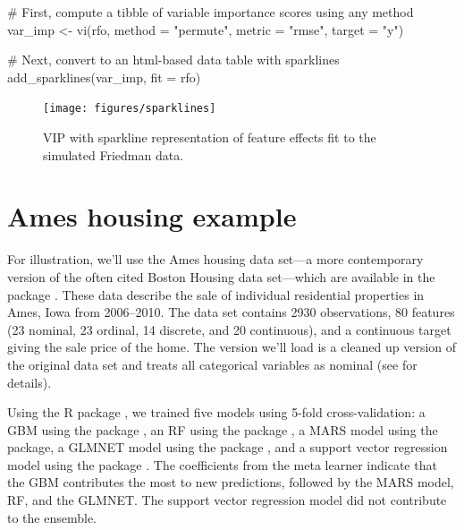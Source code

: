 \begin{example}
# First, compute a tibble of variable importance scores using any method
var_imp <- vi(rfo, method = "permute", metric = "rmse", target = "y")

# Next, convert to an html-based data table with sparklines
add_sparklines(var_imp, fit = rfo)
\end{example}

\begin{figure}[!htb]
  \centering 
  \texttt{[image: figures/sparklines]} 
  \caption{VIP with sparkline representation of feature effects fit to the simulated Friedman data.}
  \label{fig:sparklines}
\end{figure}


\section{Ames housing example}

For illustration, we'll use the Ames housing data set---a more contemporary version of the often cited Boston Housing data set---which are available in the  package \citep{AmesHousing-pkg}. These data describe the sale of individual residential properties in Ames, Iowa from 2006--2010. The data set contains 2930 observations, 80 features (23 nominal, 23 ordinal, 14 discrete, and 20 continuous), and a continuous target giving the sale price of the home. The version we'll load is a cleaned up version of the original data set and treats all categorical variables as nominal (see  for details).

Using the R package  \citep{SuperLearner-pkg}, we trained five models using 5-fold cross-validation: a GBM using the  package \citep{xgboost-pkg}, an RF using the  package \citep{ranger-pkg}, a MARS model using the  package, a GLMNET model using the  package \citep{glmnet-pkg}, and a support vector regression model using the  package \citep{kernlab-pkg}. The coefficients from the meta learner indicate that the GBM contributes the most to new predictions, followed by the MARS model, RF, and the GLMNET. The support vector regression model did not contribute to the ensemble.

